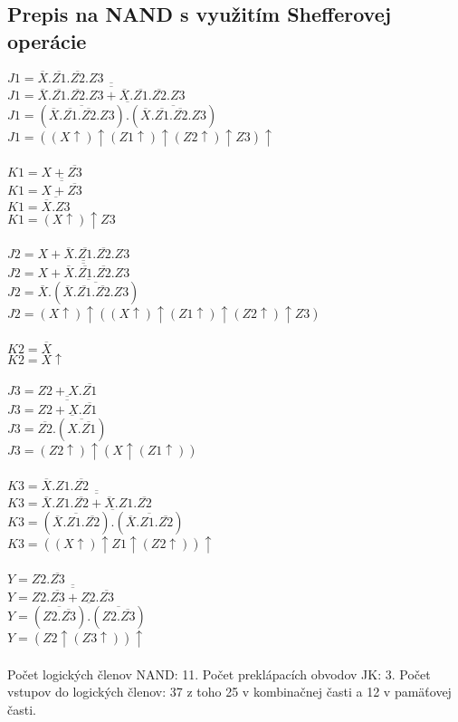 \documentclass{article}
\begin{document}
\subsection{Prepis na NAND s využitím Shefferovej operácie}
$J1 = \overline{X}.\overline{Z1}.\overline{Z2}.Z3$\\
$J1 = \overline{\overline{\overline{X}.\overline{Z1}.\overline{Z2}.Z3+\overline{X}.\overline{Z1}.\overline{Z2}.Z3}}$\\
$J1 = \overline{(\overline{\overline{X}.\overline{Z1}.\overline{Z2}.Z3}).(\overline{\overline{X}.\overline{Z1}.\overline{Z2}.Z3})}$\\
$J1 = ((X\uparrow)\uparrow(Z1\uparrow)\uparrow(Z2\uparrow)\uparrow Z3)\uparrow$\\\\
$K1 = X+\overline{Z3}$\\
$K1 = \overline{\overline{X+\overline{Z3}}}$\\
$K1 = \overline{\overline{X}.Z3}$\\
$K1 = (X\uparrow)\uparrow Z3$\\\\
$J2 = X+\overline{X}.\overline{Z1}.\overline{Z2}.Z3$\\
$J2 = \overline{\overline{X+\overline{X}.\overline{Z1}.\overline{Z2}.Z3}}$\\
$J2 = \overline{\overline{X}.(\overline{\overline{X}.\overline{Z1}.\overline{Z2}.Z3})}$\\
$J2 = (X\uparrow)\uparrow((X\uparrow)\uparrow(Z1\uparrow)\uparrow(Z2\uparrow)\uparrow Z3)$\\\\
$K2 = \overline{X}$\\
$K2 = X\uparrow$\\\\
$J3 = Z2+X.\overline{Z1}$\\
$J3 = \overline{\overline{Z2+X.\overline{Z1}}}$\\
$J3 = \overline{\overline{Z2}.(\overline{X.\overline{Z1}})}$\\
$J3 = (Z2\uparrow)\uparrow(X\uparrow(Z1\uparrow))$\\\\
$K3 = \overline{X}.Z1.\overline{Z2}$\\
$K3 = \overline{\overline{\overline{X}.Z1.\overline{Z2}+\overline{X}.Z1.\overline{Z2}}}$\\
$K3 = \overline{(\overline{\overline{X}.Z1.\overline{Z2}}).(\overline{\overline{X}.Z1.\overline{Z2}})}$\\
$K3 = ((X\uparrow)\uparrow Z1\uparrow(Z2\uparrow))\uparrow$\\\\
$Y = Z2.\overline{Z3}$\\
$Y = \overline{\overline{Z2.\overline{Z3}+Z2.\overline{Z3}}}$\\
$Y = \overline{(\overline{Z2.\overline{Z3}}).(\overline{Z2.\overline{Z3}})}$\\
$Y = (Z2\uparrow(Z3\uparrow))\uparrow$\\\\
Počet logických členov NAND: 11. 
Počet preklápacích obvodov JK: 3. 
Počet vstupov do logických členov: 37 z toho 25 v kombinačnej časti a 12 v pamäťovej časti.\pagebreak
\end{document}
